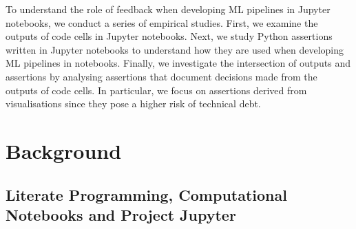 To understand the role of feedback when developing ML pipelines in Jupyter notebooks, we conduct a series of  empirical studies. First, we examine the outputs of code cells in Jupyter notebooks. Next, we study Python assertions written in Jupyter notebooks to understand how they are used when developing ML pipelines in notebooks. Finally, we investigate the intersection of outputs and assertions by analysing  assertions that document decisions made from the outputs of code cells. In particular, we focus on assertions derived from visualisations since they pose a higher risk of technical debt.





\section{Background}\label{sec:background}

\subsection{Literate Programming, Computational Notebooks and Project Jupyter}

